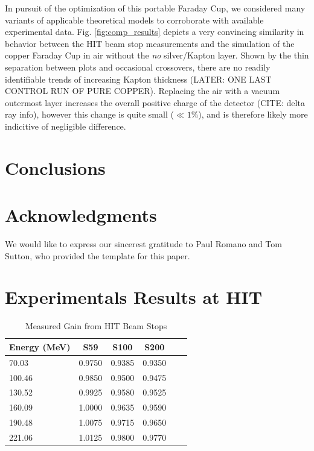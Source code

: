 \documentclass{mc2015}
\begin{document}
In pursuit of the optimization of this portable Faraday Cup, we considered many variants of applicable theoretical models to corroborate with available experimental data.  Fig. \ref{fig:comp_results} depicts a very convincing similarity in behavior between the HIT beam stop measurements and the simulation of the copper Faraday Cup in air without the \emph{no} silver/Kapton layer. Shown by the thin separation between plots and occasional crossovers, there are no readily identifiable trends of increasing Kapton thickness (LATER: ONE LAST CONTROL RUN OF PURE COPPER). Replacing the air with a vacuum outermost layer increases the overall positive charge of the detector (CITE: delta ray info), however this change is quite small ($\ll 1\%$), and is therefore likely more indicitive of negligible difference\cite{bo88}.


\section{Conclusions}


\section{Acknowledgments}

We would like to express our sincerest gratitude to Paul Romano and Tom Sutton, who provided the template for this paper.



\setlength{\baselineskip}{12pt}



\appendix
\section{Experimentals Results at HIT\cite{PTC-HIT}}

\begin{table}[H]
  \centering
  \caption{Measured Gain from HIT Beam Stops}
  \begin{tabular}{lccccc}
    \toprule
    Energy (MeV) & S59 & S100 & S200 \\
    \midrule
    70.03  & \num{0.9750} & \num{0.9385} & \num{0.9350} \\
    100.46 & \num{0.9850} & \num{0.9500} & \num{0.9475} \\
    130.52 & \num{0.9925} & \num{0.9580} & \num{0.9525} \\
    160.09 & \num{1.0000} & \num{0.9635} & \num{0.9590} \\
    190.48 & \num{1.0075} & \num{0.9715} & \num{0.9650} \\
    221.06 & \num{1.0125} & \num{0.9800} & \num{0.9770} \\
    \bottomrule
  \end{tabular}
  \label{tab:HIT_data}
\end{table}
\end{document}
